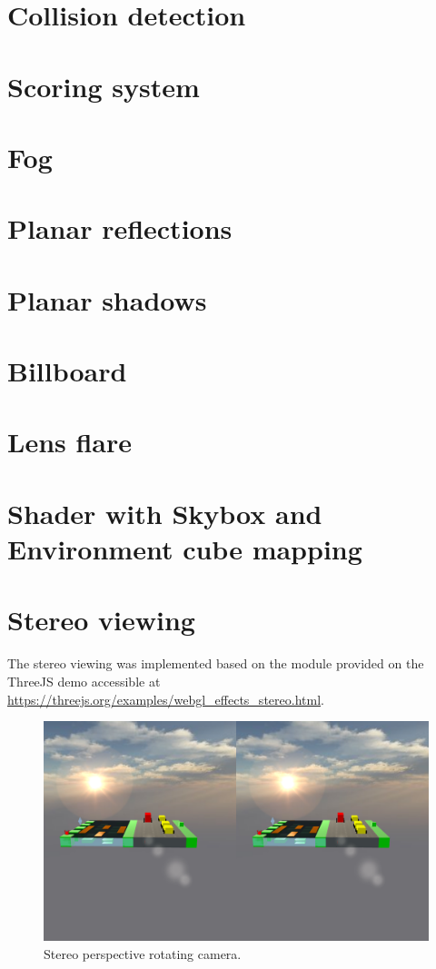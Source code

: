 \documentclass[a4paper,10pt]{article}
\begin{document}
\section{Collision detection}

\section{Scoring system}

\section{Fog}

\section{Planar reflections}

\section{Planar shadows}

\section{Billboard}

\section{Lens flare}

\section{Shader with Skybox and Environment cube mapping}

\section{Stereo viewing}
The stereo viewing was implemented based on the module provided on the ThreeJS demo accessible at \url{https://threejs.org/examples/webgl_effects_stereo.html}. 

\begin{figure}[!htb]
	\centering
 	\includegraphics[width=\linewidth]{images/cam_stereo.png}
  	\caption{Stereo perspective rotating camera.}
\end{figure}
\end{document}
